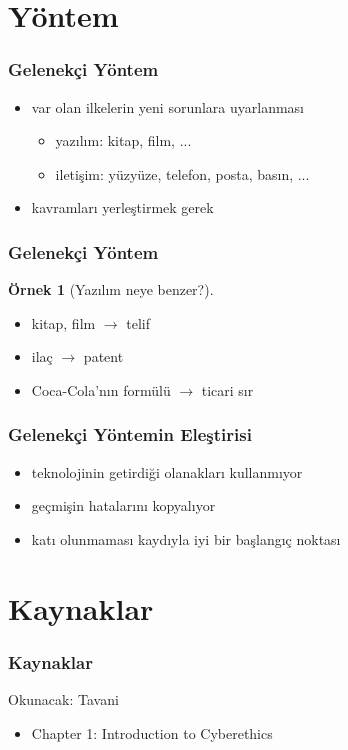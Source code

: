 \documentclass[dvipsnames]{beamer}
\theoremstyle{definition}
\theoremstyle{example}
\newtheorem{ornek}[theorem]{Örnek}
\theoremstyle{plain}
\begin{document}
\section{Yöntem}

\begin{frame}
  \frametitle{Gelenekçi Yöntem}

  \begin{itemize}
    \item var olan ilkelerin yeni sorunlara uyarlanması
    \begin{itemize}
      \item yazılım: kitap, film, ...
      \item iletişim: yüzyüze, telefon, posta, basın, ...
    \end{itemize}

    \bigskip
    \item kavramları yerleştirmek gerek
  \end{itemize}
\end{frame}

\begin{frame}
  \frametitle{Gelenekçi Yöntem}

  \begin{ornek}[Yazılım neye benzer?]
    \begin{itemize}
      \item kitap, film $\rightarrow$ telif
      \item ilaç $\rightarrow$ patent
      \item Coca-Cola'nın formülü $\rightarrow$ ticari sır
    \end{itemize}
  \end{ornek}
\end{frame}

\begin{frame}
  \frametitle{Gelenekçi Yöntemin Eleştirisi}

  \begin{itemize}
    \item teknolojinin getirdiği olanakları kullanmıyor
    \item geçmişin hatalarını kopyalıyor

    \bigskip
    \item katı olunmaması kaydıyla iyi bir başlangıç noktası
  \end{itemize}
\end{frame}

\section*{Kaynaklar}

\begin{frame}
  \frametitle{Kaynaklar}

  \begin{block}{Okunacak: Tavani}
    \begin{itemize}
      \item Chapter 1: \alert{Introduction to Cyberethics}
    \end{itemize}
  \end{block}
\end{frame}
\end{document}
